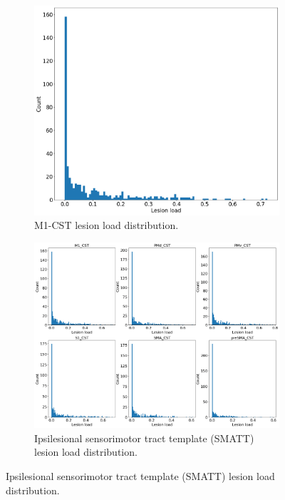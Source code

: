 \documentclass[10pt]{article}
\begin{document}
\begin{figure}
\begin{subfigure}{0.5\textwidth}
  \centering
  \includegraphics[width=1\linewidth]{figures/m1_lesionload.png}
  \caption{M1-CST lesion load distribution.}
  \label{fig:sfig1}
\end{subfigure}
\begin{subfigure}{0.5\textwidth}
  \centering
  \includegraphics[width=1\linewidth]{figures/all_lesionload.png}
  \caption{Ipsilesional sensorimotor tract template (SMATT) lesion load distribution.}
  \label{fig:sfig2}
\end{subfigure}

\end{figure}
\end{document}

